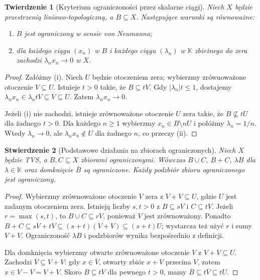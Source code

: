 \documentclass[11pt,a4paper]{article}
\numberwithin{equation}{section}
\theoremstyle{plain}
\newtheorem{twierdzenie}{Twierdzenie}[section]
\newtheorem{stwierdzenie}[twierdzenie]{Stwierdzenie}
\theoremstyle{definition}
\theoremstyle{remark}
\newcommand{\K}{\mathbb K}
\begin{document}
\begin{twierdzenie}[Kryterium ograniczoności przez skalarne ciągi]
\label{thm:bounded-sequential-test}
Niech $X$ będzie przestrzenią liniowo-topologiczną, a
$B\subseteq X$. Następujące warunki są równoważne:
\begin{enumerate}[label=\textup{(\roman*)}]
\item $B$ jest ograniczony w sensie von Neumanna;
\item dla każdego ciągu $(x_n)$ w $B$ i każdego ciągu
      $(\lambda_n)$ w $\K$ zbieżnego do zera zachodzi
      $\lambda_nx_n\to0$ w $X$.
\end{enumerate}
\end{twierdzenie}
\begin{proof}
Załóżmy (i). Niech $U$ będzie otoczeniem zera; wybierzmy
zrównoważone otoczenie $V\subseteq U$.
Istnieje $t>0$ takie, że $B\subseteq tV$.
Gdy $|\lambda_n|t\le1$, dostajemy
$\lambda_nx_n\in\lambda_ntV\subseteq V\subseteq U$.
Zatem $\lambda_nx_n\to0$.

Jeżeli (i) nie zachodzi, istnieje zrównoważone otoczenie
$U$ zera takie, że $B\not\subseteq tU$ dla żadnego $t>0$.
Dla każdego $n\ge1$ wybierzmy $x_n\in B\setminus nU$
i połóżmy $\lambda_n=1/n$. Wtedy $\lambda_n\to0$,
ale $\lambda_nx_n\notin U$ dla żadnego $n$, co przeczy (ii).
\end{proof}

\begin{stwierdzenie}[Podstawowe działania na zbiorach ograniczonych]
\label{prop:bounded-operations}
Niech $X$ będzie TVS, a $B,C\subseteq X$ zbiorami ograniczonymi.
Wówczas $B\cup C$, $B+C$, $\lambda B$ dla $\lambda\in\K$
oraz domknięcie $\overline B$ są ograniczone. Każdy podzbiór
zbioru ograniczonego jest ograniczony.
\end{stwierdzenie}
\begin{proof}
Wybierzmy zrównoważone otoczenie $V$ zera z
$V+V\subseteq U$, gdzie $U$ jest zadanym otoczeniem zera.
Istnieją liczby $s,t>0$ z $B\subseteq sV$ i $C\subseteq tV$.
Jeżeli $r=\max(s,t)$, to $B\cup C\subseteq rV$, ponieważ
$V$ jest zrównoważony. Ponadto
$B+C\subseteq sV+tV\subseteq (s+t)(V+V)\subseteq(s+t)U$;
wystarcza też użyć $r$ i sumy $V+V$. Ograniczoność
$\lambda B$ i podzbiorów wynika bezpośrednio z definicji.

Dla domknięcia wybierzmy otwarte zrównoważone otoczenie
$V$ z $V+V\subseteq U$. Zachodzi $\overline V\subseteq V+V$:
gdy $x\in\overline V$, otwarty zbiór $x+V$ przecina $V$,
zatem $x\in V-V=V+V$. Skoro $B\subseteq tV$ dla pewnego
$t>0$, mamy
$\overline B\subseteq t\overline V\subseteq tU$.
\end{proof}
\end{document}
